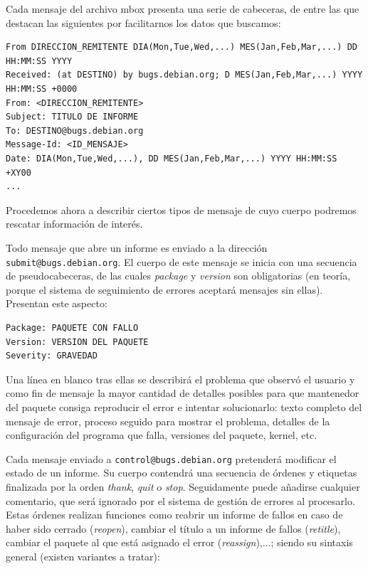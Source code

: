 Cada mensaje del archivo mbox presenta una serie de cabeceras, de entre las
que destacan las siguientes por facilitarnos los datos que buscamos:

{\scriptsize
\begin{verbatim}
From DIRECCION_REMITENTE DIA(Mon,Tue,Wed,...) MES(Jan,Feb,Mar,...) DD HH:MM:SS YYYY
Received: (at DESTINO) by bugs.debian.org; D MES(Jan,Feb,Mar,...) YYYY HH:MM:SS +0000
From: <DIRECCION_REMITENTE>
Subject: TITULO DE INFORME
To: DESTINO@bugs.debian.org
Message-Id: <ID_MENSAJE>
Date: DIA(Mon,Tue,Wed,...), DD MES(Jan,Feb,Mar,...) YYYY HH:MM:SS +XY00
...
\end{verbatim}
}

Procedemos ahora a describir ciertos tipos de mensaje de cuyo cuerpo podremos
rescatar información de interés.

Todo mensaje que abre un informe es enviado a la dirección
\texttt{submit@\-bugs.\-debian\-.org}. El cuerpo de este mensaje se inicia con una
secuencia de pseudocabeceras, de las cuales \textit{package} y \textit{version}
son obligatorias (en teoría, porque el sistema de seguimiento de errores
aceptará mensajes sin ellas). Presentan este aspecto:

{\footnotesize
\begin{verbatim}
Package: PAQUETE CON FALLO
Version: VERSION DEL PAQUETE
Severity: GRAVEDAD
\end{verbatim}
}

Una línea en blanco tras ellas se describirá el problema que observó el usuario y
como fin de mensaje la mayor cantidad de detalles posibles para que mantenedor
del paquete consiga reproducir el error e intentar solucionarlo: texto completo
del mensaje de error, proceso seguido para mostrar el problema, detalles de la
configuración del programa que falla, versiones del paquete, kernel, etc.

Cada mensaje enviado a \texttt{control@\-bugs.\-debian.org} pretenderá modificar
el estado de un informe.
Su cuerpo contendrá una secuencia de órdenes y etiquetas finalizada por la orden
\textit{thank}, \textit{quit} o \textit{stop}.
Seguidamente puede añadirse cualquier comentario, que será ignorado por el sistema
de gestión de errores al procesarlo.
Estas órdenes realizan funciones como reabrir un informe de fallos en caso
de haber sido cerrado (\textit{reopen}), cambiar el título a un informe de
fallos (\textit{retitle}),
cambiar el paquete al que está asignado el error (\textit{reassign}),...;
siendo su sintaxis general (existen variantes a tratar):

